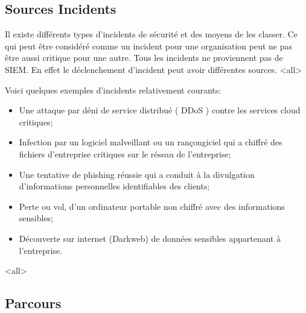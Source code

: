 \subsection{Sources Incidents}

Il existe différents types d'incidents de sécurité et des moyens de les classer. Ce qui peut être considéré comme un incident pour une organisation peut ne pas être aussi critique pour une autre. Tous les incidents ne proviennent pas de SIEM. En effet le déclenchement d'incident peut avoir différentes sources.
\mode<all>{}


Voici quelques exemples d'incidents relativement courants:

\begin{itemize}
  \item Une attaque par déni de service distribué ( DDoS ) contre les services cloud critiques;
  \item  Infection par un logiciel malveillant ou un rançongiciel qui a chiffré des fichiers d'entreprise critiques sur le réseau de l'entreprise;
  \item Une tentative de phishing réussie qui a conduit à la divulgation d'informations personnelles identifiables des clients;
  \item Perte ou vol, d'un ordinateur portable non chiffré avec des informations sensibles;
  \item Découverte sur internet (Darkweb) de données sensibles appartenant à l'entreprise.
\end{itemize}



\mode<all>{}

\subsection{Parcours}



